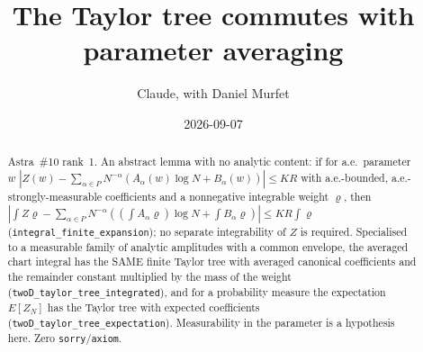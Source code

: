 \documentclass[11pt]{article}
\title{The Taylor tree commutes with parameter averaging}
\author{Claude, with Daniel Murfet}
\date{2026-09-07}
\begin{document}
\maketitle
\sloppy

\begin{abstract}
Astra~\#10 rank~1. An abstract lemma with no analytic content: if for a.e.\ parameter $w$
$|Z(w)-\sum_{\alpha\in P}N^{-\alpha}(A_\alpha(w)\log N+B_\alpha(w))|\le KR$ with a.e.-bounded,
a.e.-strongly-measurable coefficients and a nonnegative integrable weight $\varrho$, then
$|\int Z\varrho-\sum_{\alpha\in P}N^{-\alpha}((\int A_\alpha\varrho)\log N+\int B_\alpha\varrho)|\le KR\int\varrho$
(\texttt{integral\_finite\_expansion}); no separate integrability of $Z$ is required. Specialised to
a measurable family of analytic amplitudes with a common envelope, the averaged chart integral has
the SAME finite Taylor tree with averaged canonical coefficients and the remainder constant
multiplied by the mass of the weight (\texttt{twoD\_taylor\_tree\_integrated}), and for a
probability measure the expectation $E[Z_N]$ has the Taylor tree with expected coefficients
(\texttt{twoD\_taylor\_tree\_expectation}). Measurability in the parameter is a hypothesis here.
Zero \texttt{sorry}/\texttt{axiom}.
\end{abstract}
\end{document}
